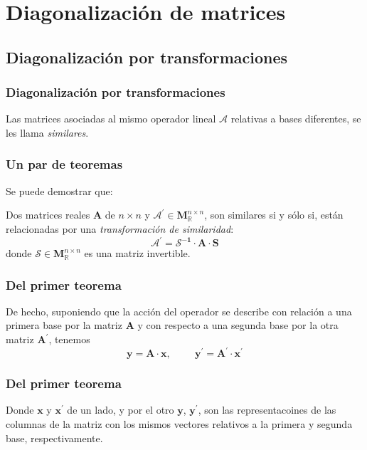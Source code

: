 \section{Diagonalización de matrices}
\subsection{Diagonalización por transformaciones}
\begin{frame}
\frametitle{Diagonalización por transformaciones}
Las matrices asociadas al mismo operador lineal $\mathcal{A}$ relativas a bases diferentes, se les llama \emph{similares}.
\end{frame}
\begin{frame}[fragile]
\frametitle{Un par de teoremas}
Se puede demostrar que:
\begin{teo}
Dos matrices reales $\mathbf{A}$ de $n \times n$ y $\mathbf{\mathcal{A}^{\prime}} \in \mathbf{M}_{\mathbb{R}}^{n \times n}$, son similares si y sólo si, están relacionadas por una \emph{transformación de similaridad}:
\begin{equation}
\mathbf{\mathcal{A}^{\prime}} =  \mathbf{\mathcal{S}^{-1}} \cdot \mathbf{A} \cdot \mathbf{S}
\label{eq:ecuacion_08_10}
\end{equation}
donde $\mathbf{\mathcal{S}} \in \mathbf{M}_{\mathbb{R}}^{n \times n}$ es una matriz invertible.
\end{teo}
\end{frame}
\begin{frame}
\frametitle{Del primer teorema}
De hecho, suponiendo que la acción del operador se describe con relación a una primera base por la matriz $\mathbf{A}$ y con respecto a una segunda base por la otra matriz $\mathbf{A^{\prime}}$, tenemos
\begin{equation}
\mathbf{y} = \mathbf{A} \cdot \mathbf{x}, \hspace{1cm} \mathbf{y^{\prime}} = \mathbf{A^{\prime}} \cdot \mathbf{x^{\prime}}
\label{eq:ecuacion_08_11}
\end{equation}
\end{frame}
\begin{frame}
\frametitle{Del primer teorema}
Donde $\mathbf{x}$ y $\mathbf{x^{\prime}}$ de un lado, y por el otro  $\mathbf{y}$, $\mathbf{y^{\prime}}$, son las representacoines de las columnas de la matriz con los mismos vectores relativos a la primera y segunda base, respectivamente.
\end{frame}
